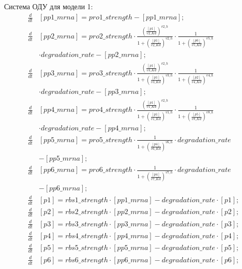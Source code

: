 Система ОДУ для модели 1:
\[ \begin{aligned}
  \frac{d}{dt}&[pp1\_mrna] = pro1\_strength - [pp1\_mrna]; \\
  \frac{d}{dt}&[pp2\_mrna] = pro2\_strength
    \cdot \frac{(\frac{[p1]}{v2\_Kd})^{v2\_h}}{1+(\frac{[p1]}{v2\_Kd})^{v2\_h}}
    \cdot \frac{1}{1+(\frac{[p6]}{v5\_Kd})^{v5\_h}} \\
    & \cdot degradation\_rate - [pp2\_mrna]; \\
  \frac{d}{dt}&[pp3\_mrna] = pro3\_strength 
    \cdot \frac{(\frac{[p1]}{v3\_Kd})^{v2\_h}}{1+(\frac{[p1]}{v3\_Kd})^{v3\_h}} 
    \cdot \frac{1}{1+(\frac{[p2]}{v4\_Kd})^{v4\_h}} \\
    & \cdot degradation\_rate - [pp3\_mrna]; \\
  \frac{d}{dt}&[pp4\_mrna] = pro4\_strength 
    \cdot \frac{(\frac{[p1]}{v1\_Kd})^{v2\_h}}{1+(\frac{[p1]}{v1\_Kd})^{v1\_h}} 
    \cdot \frac{1}{1+(\frac{[p5]}{v8\_Kd})^{v8\_h}} \\
    & \cdot degradation\_rate - [pp4\_mrna]; \\
  \frac{d}{dt}&[pp5\_mrna] = pro5\_strength
    \cdot \frac{1}{1+(\frac{[p4]}{v6\_Kd})^{v6\_h}} \cdot degradation\_rate \\
    & - [pp5\_mrna]; \\
  \frac{d}{dt}&[pp6\_mrna] = pro6\_strength
    \cdot \frac{1}{1+(\frac{[p4]}{v7\_Kd})^{v7\_h}} \cdot degradation\_rate \\
    & - [pp6\_mrna]; \\
  \frac{d}{dt}&[p1] = rbs1\_strength \cdot [pp1\_mrna] - degradation\_rate \cdot [p1]; \\
  \frac{d}{dt}&[p2] = rbs2\_strength \cdot [pp2\_mrna] - degradation\_rate \cdot [p2]; \\
  \frac{d}{dt}&[p3] = rbs3\_strength \cdot [pp3\_mrna] - degradation\_rate \cdot [p3]; \\
  \frac{d}{dt}&[p4] = rbs4\_strength \cdot [pp4\_mrna] - degradation\_rate \cdot [p4]; \\
  \frac{d}{dt}&[p5] = rbs5\_strength \cdot [pp5\_mrna] - degradation\_rate \cdot [p5]; \\
  \frac{d}{dt}&[p6] = rbs6\_strength \cdot [pp6\_mrna] - degradation\_rate \cdot [p6];
\end{aligned} \]


